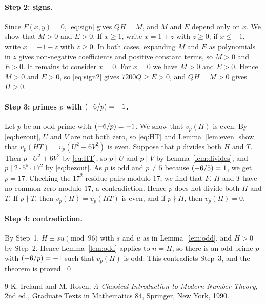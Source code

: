 \documentclass[11pt]{article}
\newcommand{\leg}[2]{\mathchoice{\biggl(\dfrac{#1}{#2}\biggr)}{(#1/#2)}{(#1/#2)}{(#1/#2)}}
\begin{document}
\paragraph{Step 2: signs.} Since $F(x,y)=0$, \eqref{eq:sign} gives $QH=M$, and $M$ and $E$ depend only on $x$. We show that $M>0$ and $E>0$. If $x\geq1$, write $x=1+z$ with $z\geq0$; if $x\leq-1$, write $x=-1-z$ with $z\geq0$. In both cases, expanding $M$ and $E$ as polynomials in $z$ gives non-negative coefficients and positive constant terms, so $M>0$ and $E>0$. It remains to consider $x=0$. For $x=0$ we have $M>0$ and $E>0$. Hence $M>0$ and $E>0$, so \eqref{eq:sign2} gives $7200Q\geq E>0$, and $QH=M>0$ gives $H>0$.

\paragraph{\texorpdfstring{Step 3: primes $p$ with $\leg{-6}{p}=-1$.}{Step 3: inert primes.}} Let $p$ be an odd prime with $\leg{-6}{p}=-1$. We show that $v_p(H)$ is even. By \eqref{eq:bezout}, $U$ and $V$ are not both zero, so \eqref{eq:HT} and Lemma~\ref{lem:even} show that $v_p(HT)=v_p(U^2+6V^2)$ is even. Suppose that $p$ divides both $H$ and $T$. Then $p\mid U^2+6V^2$ by \eqref{eq:HT}, so $p\mid U$ and $p\mid V$ by Lemma~\ref{lem:divides}, and $p\mid 2\cdot 5^{5}\cdot 17^{2}$ by \eqref{eq:bezout}. As $p$ is odd and $p\neq5$ because $\leg{-6}{5}=1$, we get $p=17$. Checking the $17^2$ residue pairs modulo $17$, we find that $F$, $H$ and $T$ have no common zero modulo $17$, a contradiction. Hence $p$ does not divide both $H$ and $T$. If $p\nmid T$, then $v_p(H)=v_p(HT)$ is even, and if $p\nmid H$, then $v_p(H)=0$.

\paragraph{Step 4: contradiction.} By Step~1, $H\equiv su\pmod{96}$ with $s$ and $u$ as in Lemma~\ref{lem:odd}, and $H>0$ by Step~2. Hence Lemma~\ref{lem:odd} applies to $n=H$, so there is an odd prime $p$ with $\leg{-6}{p}=-1$ such that $v_p(H)$ is odd. This contradicts Step~3, and the theorem is proved.
\qed

\begin{thebibliography}{9}
 K. Ireland and M. Rosen, \emph{A Classical Introduction to Modern Number Theory}, 2nd ed., Graduate Texts in Mathematics 84, Springer, New York, 1990.
\end{thebibliography}
\end{document}
